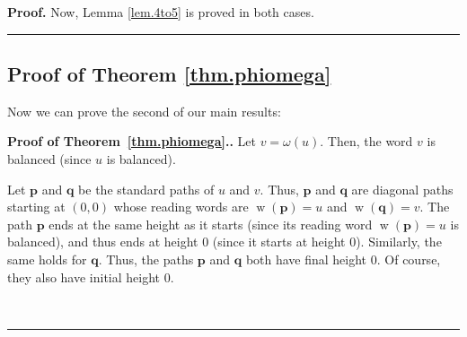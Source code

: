 \documentclass[numbers=enddot,12pt,final,onecolumn,notitlepage]{scrartcl}%
\theoremstyle{definition}
\newenvironment{proof}[1][Proof]{\noindent\textbf{#1.} }{\ \rule{0.5em}{0.5em}}
\newcommand{\pp}{\mathbf{p}}
\newcommand{\qq}{\mathbf{q}}
\newcommand{\w}{\operatorname{w}}
\newcommand{\tup}[1]{\left( #1 \right)}
\newenvironment{verlong}{}{}
\begin{document}
\begin{verlong}
\begin{proof}
Now, Lemma \ref{lem.4to5} is proved in both cases.
\end{proof}

\subsection{Proof of Theorem \ref{thm.phiomega}}

Now we can prove the second of our main results:

\begin{proof}[Proof of Theorem~\ref{thm.phiomega}.]
Let $v=\omega\left(  u\right)  $.
Then, the word $v$ is balanced (since $u$ is balanced).

Let $\pp$ and $\qq$ be the standard paths of $u$ and $v$.
Thus, $\pp$ and $\qq$ are diagonal paths starting at $\left(
0,0\right)  $ whose reading words are $\w\tup{\pp} = u$ and
$\w\tup{\qq} = v$. The path $\pp$ ends at the same
height as it starts (since its reading word $\w\left(  \pp\right)  =u$
is balanced), and thus ends at height $0$ (since it starts at height $0$).
Similarly, the same holds for $\qq$. Thus, the paths $\pp$ and
$\qq$ both have final height $0$. Of course, they also
have initial height $0$.


\end{proof}
\end{verlong}
\end{document}
